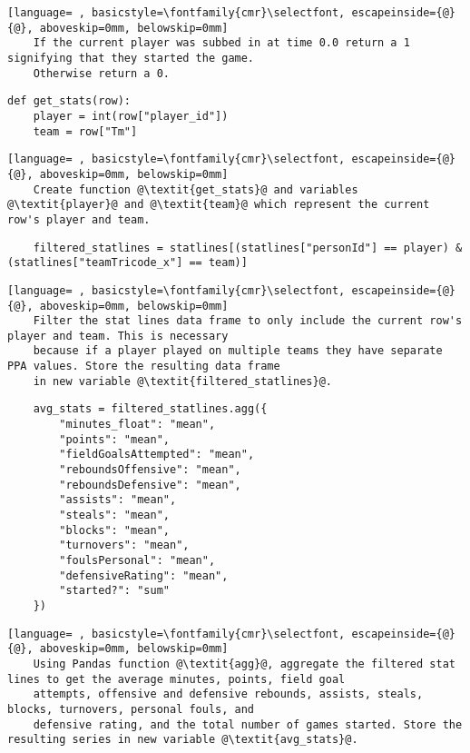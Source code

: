 \documentclass{article}
\begin{document}
\begin{lstlisting}[language= , basicstyle=\fontfamily{cmr}\selectfont, escapeinside={@}{@}, aboveskip=0mm, belowskip=0mm]
    If the current player was subbed in at time 0.0 return a 1 signifying that they started the game.
    Otherwise return a 0.
\end{lstlisting}
\begin{lstlisting}
def get_stats(row):
    player = int(row["player_id"])
    team = row["Tm"]
\end{lstlisting}
\begin{lstlisting}[language= , basicstyle=\fontfamily{cmr}\selectfont, escapeinside={@}{@}, aboveskip=0mm, belowskip=0mm]
    Create function @\textit{get_stats}@ and variables @\textit{player}@ and @\textit{team}@ which represent the current row's player and team.
\end{lstlisting}
\begin{lstlisting}
    filtered_statlines = statlines[(statlines["personId"] == player) & (statlines["teamTricode_x"] == team)]
\end{lstlisting}
\begin{lstlisting}[language= , basicstyle=\fontfamily{cmr}\selectfont, escapeinside={@}{@}, aboveskip=0mm, belowskip=0mm]
    Filter the stat lines data frame to only include the current row's player and team. This is necessary
    because if a player played on multiple teams they have separate PPA values. Store the resulting data frame
    in new variable @\textit{filtered_statlines}@.
\end{lstlisting}
\begin{lstlisting}
    avg_stats = filtered_statlines.agg({
        "minutes_float": "mean",
        "points": "mean",
        "fieldGoalsAttempted": "mean",
        "reboundsOffensive": "mean",
        "reboundsDefensive": "mean",
        "assists": "mean",
        "steals": "mean",
        "blocks": "mean",
        "turnovers": "mean",
        "foulsPersonal": "mean",
        "defensiveRating": "mean",
        "started?": "sum"
    })
\end{lstlisting}
\begin{lstlisting}[language= , basicstyle=\fontfamily{cmr}\selectfont, escapeinside={@}{@}, aboveskip=0mm, belowskip=0mm]
    Using Pandas function @\textit{agg}@, aggregate the filtered stat lines to get the average minutes, points, field goal
    attempts, offensive and defensive rebounds, assists, steals, blocks, turnovers, personal fouls, and
    defensive rating, and the total number of games started. Store the resulting series in new variable @\textit{avg_stats}@.
\end{lstlisting}
\end{document}

